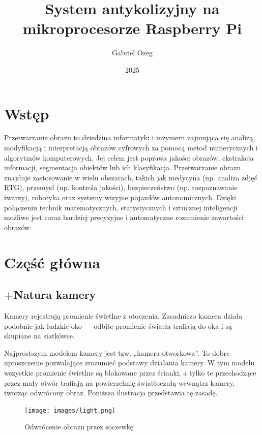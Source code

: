 \documentclass[magisterska]{pracadypl}
\author{Gabriel Ozeg}
\title{System antykolizyjny na mikroprocesorze Raspberry Pi}
\date{2025}
\begin{document}
\maketitle
\tableofcontents
\newpage

\chapter{Wstęp}

Przetwarzanie obrazu to dziedzina informatyki i inżynierii zajmująca się analizą, modyfikacją i interpretacją obrazów cyfrowych za pomocą metod numerycznych i algorytmów komputerowych. Jej celem jest poprawa jakości obrazów, ekstrakcja informacji, segmentacja obiektów lub ich klasyfikacja. Przetwarzanie obrazu znajduje zastosowanie w wielu obszarach, takich jak medycyna (np. analiza zdjęć RTG), przemysł (np. kontrola jakości), bezpieczeństwo (np. rozpoznawanie twarzy), robotyka oraz systemy wizyjne pojazdów autonomicznych. Dzięki połączeniu technik matematycznych, statystycznych i sztucznej inteligencji możliwe jest coraz bardziej precyzyjne i automatyczne rozumienie zawartości obrazów.

\chapter{Część główna}

\section{+Natura kamery}

Kamery rejestrują promienie świetlne z otoczenia. Zasadniczo kamera działa podobnie jak ludzkie oko — odbite promienie światła trafiają do oka i są skupiane na siatkówce.

Najprostszym modelem kamery jest tzw. „kamera otworkowa”. To dobre uproszczenie pozwalające zrozumieć podstawy działania kamery. W tym modelu wszystkie promienie świetlne są blokowane przez ścianki, a tylko te przechodzące przez mały otwór trafiają na powierzchnię światłoczułą wewnątrz kamery, tworząc odwrócony obraz. Poniższa ilustracja przedstawia tę zasadę.

\begin{figure}[H]
    \centering
    \texttt{[image: images/light.png]}
    \captionsetup{font=footnotesize}
    \caption[Odwrócenie obrazu przez soczewkę. https://funsizephysics.com/use-light-turn-world-upside/]{Odwrócenie obrazu przez soczewkę}
    \label{fig:rpi}
\end{figure}
\end{document}
